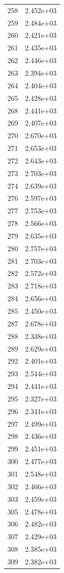 \documentclass[12pt]{article}
\begin{document}
\begin{longtable}{@{}cc@{}}
258 & 2.452e+03 \\
259 & 2.484e+03 \\
260 & 2.421e+03 \\
261 & 2.435e+03 \\
262 & 2.446e+03 \\
263 & 2.394e+03 \\
264 & 2.404e+03 \\
265 & 2.428e+03 \\
268 & 2.441e+03 \\
269 & 2.407e+03 \\
270 & 2.670e+03 \\
271 & 2.653e+03 \\
272 & 2.643e+03 \\
273 & 2.703e+03 \\
274 & 2.639e+03 \\
276 & 2.597e+03 \\
277 & 2.753e+03 \\
278 & 2.566e+03 \\
279 & 2.635e+03 \\
280 & 2.757e+03 \\
281 & 2.703e+03 \\
282 & 2.572e+03 \\
283 & 2.718e+03 \\
284 & 2.656e+03 \\
285 & 2.450e+03 \\
287 & 2.678e+03 \\
288 & 2.338e+03 \\
289 & 2.629e+03 \\
292 & 2.401e+03 \\
293 & 2.544e+03 \\
294 & 2.441e+03 \\
295 & 2.327e+03 \\
296 & 2.341e+03 \\
297 & 2.499e+03 \\
298 & 2.436e+03 \\
299 & 2.451e+03 \\
300 & 2.477e+03 \\
301 & 2.548e+03 \\
302 & 2.466e+03 \\
303 & 2.459e+03 \\
305 & 2.478e+03 \\
306 & 2.482e+03 \\
307 & 2.429e+03 \\
308 & 2.385e+03 \\
309 & 2.382e+03 \\

\end{longtable}
\end{document}
